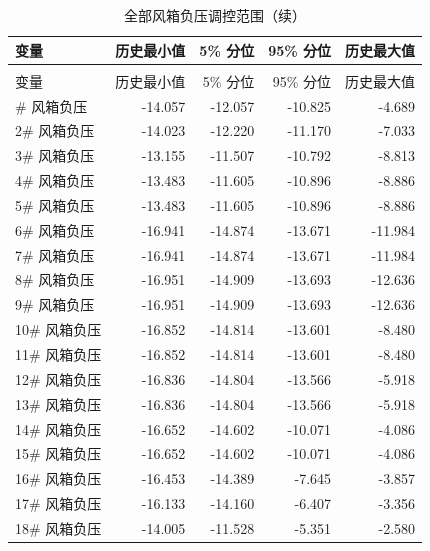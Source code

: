 \documentclass[UTF8,a4paper,zihao=-4]{ctexart}
\begin{document}
\begin{longtable}{lrrrr}
\caption{全部风箱负压调控范围}\\
\toprule
变量 & 历史最小值 & 5\% 分位 & 95\% 分位 & 历史最大值 \\
\midrule
\endfirsthead
\caption[]{全部风箱负压调控范围（续）}\\
\toprule
变量 & 历史最小值 & 5\% 分位 & 95\% 分位 & 历史最大值 \\
\midrule
\endhead
\bottomrule
\endfoot
1\# 风箱负压 & -14.057 & -12.057 & -10.825 & -4.689 \\
2\# 风箱负压 & -14.023 & -12.220 & -11.170 & -7.033 \\
3\# 风箱负压 & -13.155 & -11.507 & -10.792 & -8.813 \\
4\# 风箱负压 & -13.483 & -11.605 & -10.896 & -8.886 \\
5\# 风箱负压 & -13.483 & -11.605 & -10.896 & -8.886 \\
6\# 风箱负压 & -16.941 & -14.874 & -13.671 & -11.984 \\
7\# 风箱负压 & -16.941 & -14.874 & -13.671 & -11.984 \\
8\# 风箱负压 & -16.951 & -14.909 & -13.693 & -12.636 \\
9\# 风箱负压 & -16.951 & -14.909 & -13.693 & -12.636 \\
10\# 风箱负压 & -16.852 & -14.814 & -13.601 & -8.480 \\
11\# 风箱负压 & -16.852 & -14.814 & -13.601 & -8.480 \\
12\# 风箱负压 & -16.836 & -14.804 & -13.566 & -5.918 \\
13\# 风箱负压 & -16.836 & -14.804 & -13.566 & -5.918 \\
14\# 风箱负压 & -16.652 & -14.602 & -10.071 & -4.086 \\
15\# 风箱负压 & -16.652 & -14.602 & -10.071 & -4.086 \\
16\# 风箱负压 & -16.453 & -14.389 & -7.645 & -3.857 \\
17\# 风箱负压 & -16.133 & -14.160 & -6.407 & -3.356 \\
18\# 风箱负压 & -14.005 & -11.528 & -5.351 & -2.580 \\
\end{longtable}
\end{document}

